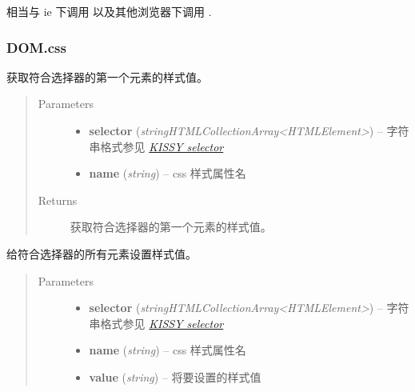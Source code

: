 \documentclass[letterpaper,10pt,english]{sphinxmanual}
\begin{document}
\begin{center}相当与 ie 下调用  以及其他浏览器下调用  .
\end{center}

\subsubsection{DOM.css}
\label{api/core/dom/css::doc}\label{api/core/dom/css:dom-css}

\begin{fulllineitems}
\label{api/core/dom/css:DOM.css}
获取符合选择器的第一个元素的样式值。
\begin{quote}\begin{description}
\item[{Parameters}] \leavevmode\begin{itemize}
\item {}
\textbf{selector} (\emph{string\textbar{}HTMLCollection\textbar{}Array\textless{}HTMLElement\textgreater{}}) -- 字符串格式参见 {\hyperref[api/core/dom/selector:dom-selector]{\emph{KISSY selector}}}

\item {}
\textbf{name} (\emph{string}) -- css 样式属性名

\end{itemize}

\item[{Returns}] \leavevmode
获取符合选择器的第一个元素的样式值。

\end{description}\end{quote}

\end{fulllineitems}



\begin{fulllineitems}
给符合选择器的所有元素设置样式值。
\begin{quote}\begin{description}
\item[{Parameters}] \leavevmode\begin{itemize}
\item {}
\textbf{selector} (\emph{string\textbar{}HTMLCollection\textbar{}Array\textless{}HTMLElement\textgreater{}}) -- 字符串格式参见 {\hyperref[api/core/dom/selector:dom-selector]{\emph{KISSY selector}}}

\item {}
\textbf{name} (\emph{string}) -- css 样式属性名

\item {}
\textbf{value} (\emph{string}) -- 将要设置的样式值

\end{itemize}

\end{description}\end{quote}

\end{fulllineitems}
\end{document}
